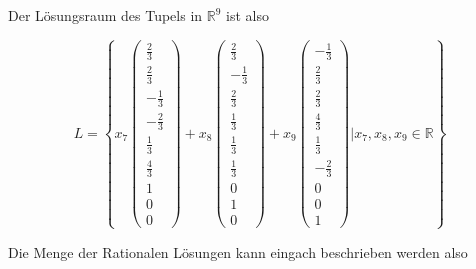 Der Lösungsraum des Tupels in $\mathbb{R}^9$ ist also 

\[
L = \left\{
  x_7\begin{pmatrix}
    \frac{2}{3}\\
    \frac{2}{3} \\ 
    - \frac{1}{3} \\
    - \frac{2}{3} \\
    \frac{1}{3} \\
    \frac{4}{3} \\
    1 \\
    0 \\
    0
  \end{pmatrix} + x_8\begin{pmatrix}
    \frac{2}{3} \\
    -\frac{1}{3} \\ 
    \frac{2}{3} \\
    \frac{1}{3} \\
    \frac{1}{3} \\
    \frac{1}{3} \\
    0 \\
    1 \\
    0
  \end{pmatrix} + x_9\begin{pmatrix}
    - \frac{1}{3} \\
    \frac{2}{3} \\ 
    \frac{2}{3} \\
    \frac{4}{3} \\
    \frac{1}{3} \\
    - \frac{2}{3} \\
    0 \\
    0 \\
    1
  \end{pmatrix} \Bigg| x_7, x_8, x_9 \in \mathbb{R} 
  \right\}
\]

Die Menge der Rationalen Lösungen kann eingach beschrieben werden also

